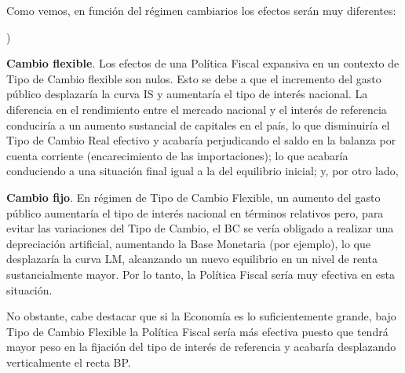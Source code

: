 \documentclass[10pt,a4paper]{article}
\newcounter{alphaitem}
\newenvironment{la}
      {\begin{list}{\alph{alphaitem})}{%
          \usecounter{alphaitem}%
          \setlength{\leftmargin}{1cm}%
          \setlength{\parskip}{3pt}%
          \setlength{\itemsep}{0pt}%
          \setlength{\parsep}{0pt}%
      }}
      {\end{list}}
\begin{document}
Como vemos, en función del régimen cambiarios los efectos serán muy diferentes:
\begin{la}
    \item \textbf{Cambio flexible}. Los efectos de una Política Fiscal expansiva en un contexto de Tipo de Cambio flexible son nulos. Esto se debe a que el incremento del gasto público desplazaría la curva IS y aumentaría el tipo de interés nacional. La diferencia en el rendimiento entre el mercado nacional y el interés de referencia conduciría a un aumento sustancial de capitales en el país, lo que disminuiría el Tipo de Cambio Real efectivo y acabaría perjudicando el saldo en la balanza por cuenta corriente (encarecimiento de las importaciones); lo que acabaría conduciendo a una situación final igual a la del equilibrio inicial; y, por otro lado,
    \item \textbf{Cambio fijo}. En régimen de Tipo de Cambio Flexible, un aumento del gasto público aumentaría el tipo de interés nacional en términos relativos pero, para evitar las variaciones del Tipo de Cambio, el BC se vería obligado a realizar una depreciación artificial, aumentando la Base Monetaria (por ejemplo), lo que desplazaría la curva LM, alcanzando un nuevo equilibrio en un nivel de renta sustancialmente mayor. Por lo tanto, la Política Fiscal sería muy efectiva en esta situación.
\end{la}

No obstante, cabe destacar que si la Economía es lo suficientemente grande, bajo Tipo de Cambio Flexible la Política Fiscal sería más efectiva puesto que tendrá mayor peso en la fijación del tipo de interés de referencia y acabaría desplazando verticalmente el recta BP.

\clearpage
\end{document}
